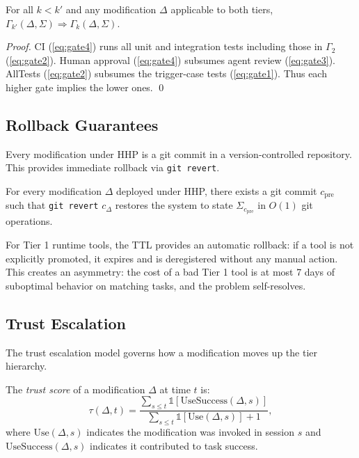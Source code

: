 \begin{proposition}
\label{prop:gate-mono}
For all $k < k'$ and any modification $\Delta$ applicable to both tiers,
$\Gamma_{k'}(\Delta, \Sigma) \Rightarrow \Gamma_k(\Delta, \Sigma)$.
\end{proposition}

\begin{proof}
CI (\ref{eq:gate4}) runs all unit and integration tests including those in
$\Gamma_2$ (\ref{eq:gate2}). Human approval (\ref{eq:gate4}) subsumes agent
review (\ref{eq:gate3}). AllTests (\ref{eq:gate2}) subsumes the trigger-case
tests (\ref{eq:gate1}). Thus each higher gate implies the lower ones. \qed
\end{proof}

\subsection{Rollback Guarantees}
\label{sec:rollback}

Every modification under HHP is a git commit in a version-controlled repository.
This provides immediate rollback via \texttt{git revert}.

\begin{invariant}
For every modification $\Delta$ deployed under HHP, there exists a git commit
$c_{\text{pre}}$ such that \texttt{git revert} $c_\Delta$ restores the system
to state $\Sigma_{c_{\text{pre}}}$ in $O(1)$ git operations.
\end{invariant}

For Tier 1 runtime tools, the TTL provides an automatic rollback: if a tool is
not explicitly promoted, it expires and is deregistered without any manual action.
This creates an asymmetry: the cost of a bad Tier 1 tool is at most 7 days of
suboptimal behavior on matching tasks, and the problem self-resolves.

\subsection{Trust Escalation}
\label{sec:trust}

The trust escalation model governs how a modification moves up the tier hierarchy.

\begin{definition}
The \emph{trust score} of a modification $\Delta$ at time $t$ is:
\begin{equation}
    \tau(\Delta, t) = \frac{\sum_{s \leq t} \mathbb{1}[\text{UseSuccess}(\Delta, s)]}
                          {\sum_{s \leq t} \mathbb{1}[\text{Use}(\Delta, s)] + 1},
\end{equation}
where $\text{Use}(\Delta, s)$ indicates the modification was invoked in session
$s$ and $\text{UseSuccess}(\Delta, s)$ indicates it contributed to task success.
\end{definition}

